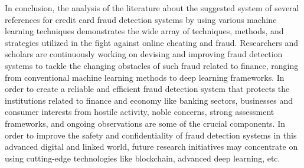In conclusion, the analysis of the literature about the suggested system of several references
for credit card fraud detection systems by using various machine learning techniques
demonstrates the wide array of techniques, methods, and strategies utilized in the fight against
online cheating and fraud. Researchers and scholars are continuously working on devising and
improving fraud detection systems to tackle the changing obstacles of such fraud related to
finance, ranging from conventional machine learning methods to deep learning frameworks. In
order to create a reliable and efficient fraud detection system that protects the institutions
related to finance and economy like banking sectors, businesses and consumer interests from
hostile activity, noble concerns, strong assessment frameworks, and ongoing observations are
some of the crucial components. In order to improve the safety and confidentiality of fraud
detection systems in this advanced digital and linked world, future research initiatives may
concentrate on using cutting-edge technologies like blockchain, advanced deep learning, etc.




